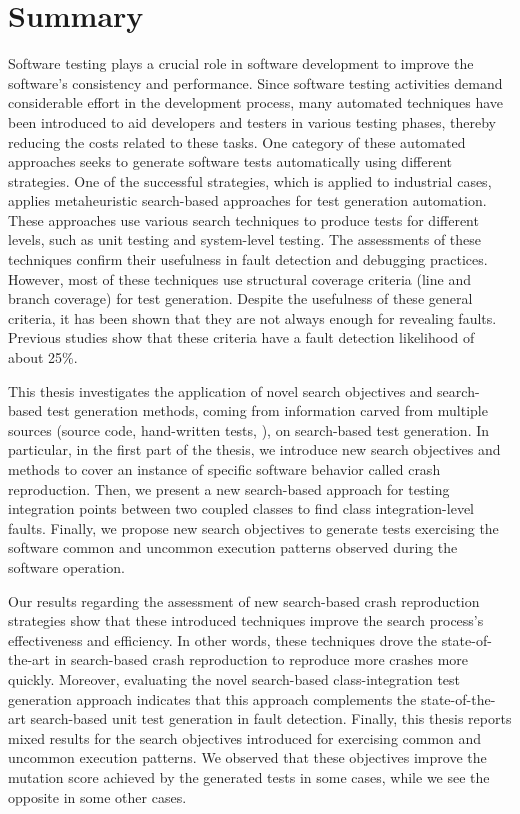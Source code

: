 \chapter*{Summary}

Software testing plays a crucial role in software development to improve the software's consistency and performance.
Since software testing activities demand considerable effort in the development process, many automated techniques have been introduced to aid developers and testers in various testing phases, thereby reducing the costs related to these tasks. One category of these automated approaches seeks to generate software tests automatically using different strategies. One of the successful strategies, which is applied to industrial cases, applies metaheuristic search-based approaches for test generation automation. These approaches use various search techniques to produce tests for different levels, such as unit testing and system-level testing. The assessments of these techniques confirm their usefulness in fault detection and debugging practices. However, most of these techniques use structural coverage criteria (\eg line and branch coverage) for test generation. Despite the usefulness of these general criteria, it has been shown that they are not always enough for revealing faults. Previous studies show that these criteria have a fault detection likelihood of about 25\%.

This thesis investigates the application of novel search objectives and search-based test generation methods, coming from information carved from multiple sources (\eg source code, hand-written tests, \etc), on search-based test generation. In particular, in the first part of the thesis, we introduce new search objectives and methods to cover an instance of specific software behavior called crash reproduction. Then, we present a new search-based approach for testing integration points between two coupled classes to find class integration-level faults. Finally, we propose new search objectives to generate tests exercising the software common and uncommon execution patterns observed during the software operation.

Our results regarding the assessment of new search-based crash reproduction strategies show that these introduced techniques improve the search process's effectiveness and efficiency. In other words, these techniques drove the state-of-the-art in search-based crash reproduction to reproduce more crashes more quickly. 
Moreover, evaluating the novel search-based class-integration test generation approach indicates that this approach complements the state-of-the-art search-based unit test generation in fault detection. 
Finally, this thesis reports mixed results for the search objectives introduced for exercising common and uncommon execution patterns. We observed that these objectives improve the mutation score achieved by the generated tests in some cases, while we see the opposite in some other cases.

